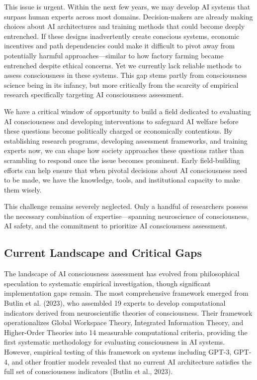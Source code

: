 \documentclass[11pt,a4paper]{article}
\begin{document}
This issue is urgent. Within the next few years, we may develop AI systems that surpass human experts across most domains. Decision-makers are already making choices about AI architectures and training methods that could become deeply entrenched. If these designs inadvertently create conscious systems, economic incentives and path dependencies could make it difficult to pivot away from potentially harmful approaches—similar to how factory farming became entrenched despite ethical concerns. Yet we currently lack reliable methods to assess consciousness in these systems. This gap stems partly from consciousness science being in its infancy, but more critically from the scarcity of empirical research specifically targeting AI consciousness assessment.

We have a critical window of opportunity to build a field dedicated to evaluating AI consciousness and developing interventions to safeguard AI welfare before these questions become politically charged or economically contentious. By establishing research programs, developing assessment frameworks, and training experts now, we can shape how society approaches these questions rather than scrambling to respond once the issue becomes prominent. Early field-building efforts can help ensure that when pivotal decisions about AI consciousness need to be made, we have the knowledge, tools, and institutional capacity to make them wisely.

This challenge remains severely neglected. Only a handful of researchers possess the necessary combination of expertise—spanning neuroscience of consciousness, AI safety, and the commitment to prioritize AI consciousness assessment.

\subsection{Current Landscape and Critical Gaps}
The landscape of AI consciousness assessment has evolved from philosophical speculation to systematic empirical investigation, though significant implementation gaps remain. The most comprehensive framework emerged from Butlin et al. (2023), who assembled 19 experts to develop computational indicators derived from neuroscientific theories of consciousness. Their framework operationalizes Global Workspace Theory, Integrated Information Theory, and Higher-Order Theories into 14 measurable computational criteria, providing the first systematic methodology for evaluating consciousness in AI systems. However, empirical testing of this framework on systems including GPT-3, GPT-4, and other frontier models revealed that no current AI architecture satisfies the full set of consciousness indicators (Butlin et al., 2023).
\end{document}

